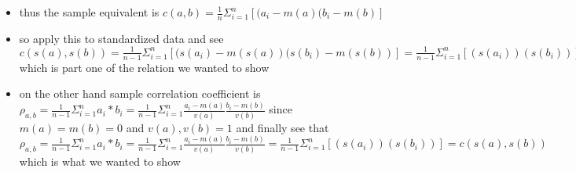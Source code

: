 \documentclass[12pt,twoside]{article}
\begin{document}
\begin{enumerate}
\begin{enumerate}
\begin{itemize}
\begin{itemize}
        \item thus the sample equivalent is $c({a},{b})=\frac{1}{n}\Sigma_{i=1}^{n}[(a_i-m({a})(b_i-m({b})]$
        \item so apply this to standardized data and see $c(s({a}),s({b}))=\frac{1}{n-1}\Sigma_{i=1}^{n}[(s(a_i)-m(s({a}))(s(b_i)-m(s({b}))]=\frac{1}{n-1}\Sigma_{i=1}^{n}[(s(a_i))(s(b_i))]$ which is part one of the relation we wanted to show 
        \item on the other hand sample correlation coefficient is $\rho_{a,b}=\frac{1}{n-1}\Sigma_{i=1}^{n}a_i*b_i=\frac{1}{n-1}\Sigma_{i=1}^{n}\frac{a_i-m(a)}{v(a)}\frac{b_i-m(b)}{v(b)}$ since $m(a)=m(b)=0$ and $v(a),v(b)=1$ and finally see that  $\rho_{a,b}=\frac{1}{n-1}\Sigma_{i=1}^{n}a_i*b_i=\frac{1}{n-1}\Sigma_{i=1}^{n}\frac{a_i-m(a)}{v(a)}\frac{b_i-m(b)}{v(b)}=\frac{1}{n-1}\Sigma_{i=1}^{n}[(s(a_i))(s(b_i))]=c(s({a}),s({b}))$ which is what we wanted to show
    \end{itemize}
\end{itemize}



\end{enumerate}
\end{enumerate}
\end{document}
